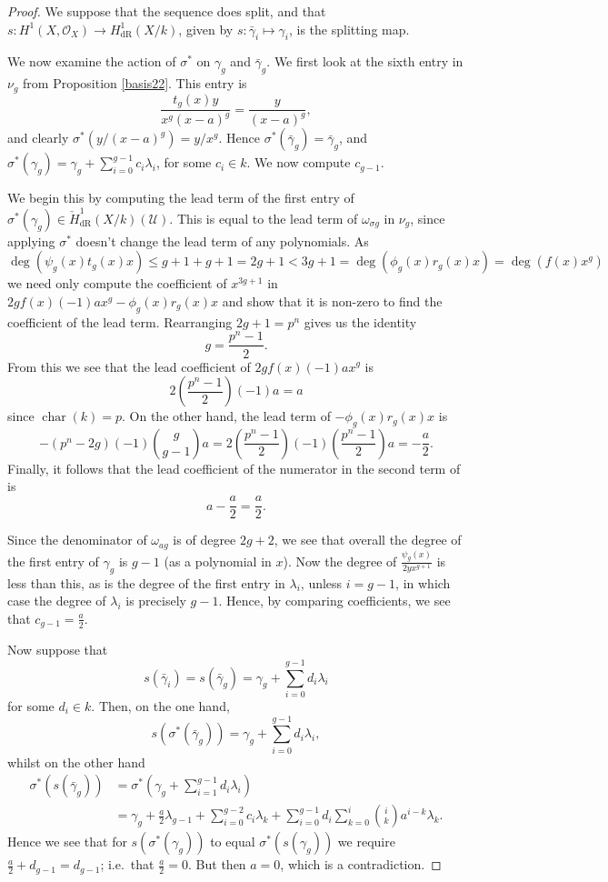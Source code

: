 \documentclass[11pt]{article} %
\theoremstyle{plain}
\theoremstyle{remark}
\newcommand{\ra}{\rightarrow}
\newcommand{\cU}{{\mathcal U}}
\newcommand{\hone}{H^1(X,\mathcal{O}_X)}
\newcommand{\derhamhone}{H_{\text {dR}}^1(X/k)}
\newcommand{\cechderhamhone}{\check{H}_{\text {dR}}^1(X/k)}
\newcommand{\ie}{i.e.\ }
\DeclareMathOperator{\cha}{char}
\begin{document}
\begin{proof}
We suppose that the sequence does split, and that $s \colon \hone \ra \derhamhone$, given by $s \colon \bar\gamma_i \mapsto \gamma_i$, is the splitting map.

We now examine the action of $\sigma^*$ on $\gamma_g$ and $\bar \gamma_g$.
We first look at the sixth entry in $\nu_g$ from Proposition \ref{basis22}.
This entry is
\[
\frac{t_g(x)y}{x^g(x-a)^g} = \frac{y}{(x-a)^g},
\]
and clearly $\sigma^*(y/(x-a)^g) = y/x^g$.
Hence $\sigma^*(\bar\gamma_g) = \bar \gamma_g$, and $\sigma^*(\gamma_g) = \gamma_g + \sum_{i =0}^{g-1}c_i\lambda_i$, for some $c_i \in k$.
We now compute $c_{g-1}$.

We begin this by computing the lead term of the first entry of $\sigma^*(\gamma_g) \in \cechderhamhone(\cU)$.
This is equal to the lead term of $\omega_{\sigma g}$ in $\nu_g$, since applying $\sigma^*$ doesn't change the lead term of any polynomials.
As
\[
\deg(\psi_g(x)t_g(x)x) \leq g+1 + g+ 1 = 2g+1 < 3g+1 = \deg(\phi_g(x)r_g(x)x) = \deg(f(x)x^g)
\]
we need only compute the coefficient of $x^{3g+1}$ in $2gf(x)(-1)ax^g - \phi_g(x)r_g(x)x$ and show that it is non-zero to find the coefficient of the lead term.
Rearranging $2g+1 = p^n $ gives us the identity
\[
g = \frac{p^n - 1}{2}.
\]
From this we see that the lead coefficient of $2gf(x)(-1)ax^g$ is 
\[
2\left( \frac{p^n-1}{2} \right) (-1)a = a
\]
since $\cha(k) = p$.
On the other hand, the lead term of $-\phi_g(x)r_g(x)x$ is
\[
-(p^n-2g)(-1)\binom{g}{g-1}a = 2\left(\frac{p^n -1 }{2}\right) (-1)\left( \frac{p^n - 1}{2} \right)a = -\frac{a}{2}.
\]
Finally, it follows that the lead coefficient of the numerator in the second term of is
\[
a - \frac{a}{2} = \frac{a}{2}.
\]


Since the denominator of $\omega_{a g}$ is of degree $2g+2$, we see that overall the degree of the first entry of $\gamma_g$ is $g-1$ (as a polynomial in $x$).
Now the degree of $\frac{\psi_g(x)}{2yx^{g+1}}$ is less than this, as is the degree of the first entry in $\lambda_i$, unless $i=g-1$, in which case the degree of $\lambda_i$ is precisely $g-1$.
Hence, by comparing coefficients, we see that $c_{g-1} = \frac{a}{2}$.

Now suppose that 
\[
s(\bar\gamma_i)  = s( \bar \gamma_g) = \gamma_g + \sum_{i=0}^{g-1}d_i \lambda_i
\]
for some $d_i \in k$.
Then, on the one hand,
\[
s(\sigma^*(\bar\gamma_g)) = \gamma_g + \sum_{i=0}^{g-1}d_i\lambda_i,
\]
whilst on the other hand
\begin{align}
\sigma^*(s(\bar\gamma_g)) & = \sigma^*(\gamma_g + \sum_{i=1}^{g-1} d_i\lambda_i ) \\
& = \gamma_g + \frac{a}{2}\lambda_{g-1} + \sum_{i=0}^{g-2} c_i \lambda_k + \sum_{i=0}^{g-1} d_i \sum_{k=0}^{i} \binom{i}{k}a^{i-k}\lambda_k.
\end{align}
Hence we see that for $s(\sigma^*(\gamma_g))$ to equal $\sigma^*(s(\gamma_g))$ we require $\frac{a}{2} + d_{g-1} = d_{g-1}$; \ie that $\frac{a}{2} = 0$. 
But then $a=0$, which is a contradiction.

\end{proof}
\end{document}
